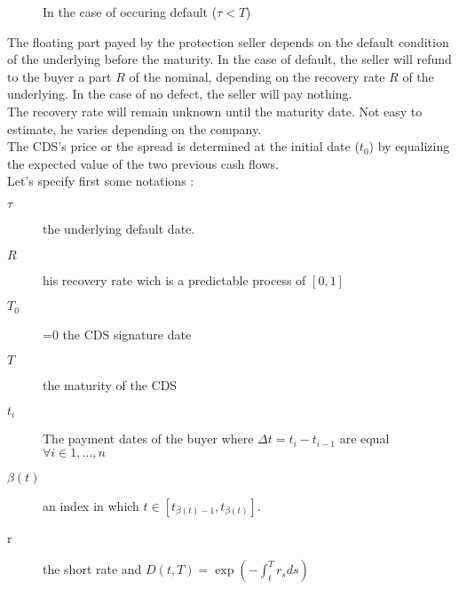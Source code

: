 \begin{figure}[H]
  \centering
  \caption{In the case of occuring default ($\tau < T$)}
\end{figure}


The  floating  part payed  by  the  protection  seller  depends on  the  default
condition of  the underlying before the  maturity.  In the case  of default, the
seller will  refund to the  buyer a  part $R$ of  the nominal, depending  on the
recovery rate $R$ of  the underlying. In the case of no  defect, the seller will
pay nothing.\\

The recovery rate will remain unknown until the maturity date. Not easy to estimate,
he varies depending on the company.\\

The CDS's  price or  the spread  is determined  at the  initial date  ($t_0$) by
equalizing the expected value of the two previous cash flows.\\

Let's specify first some notations :
\begin{description}
\item[$\tau$] the underlying default date.
\item[$R$] his recovery rate wich is a predictable process of $[0,1]$
\item[$T_0$] =0 the CDS signature date
\item[$T$] the maturity of the CDS
\item[$t_i$] The  payment dates  of the buyer  where $\Delta  t=t_i-t_{i-1}$ are
  equal $\forall i \in 1,\dots,n$
\item[$\beta(t)$] an index in which $t\in[t_{\beta(t)-1},t_{\beta(t)}]$.
\item[r] the short rate and $D(t,T)=\exp(-\int_t^Tr_sds)$
\end{description}

